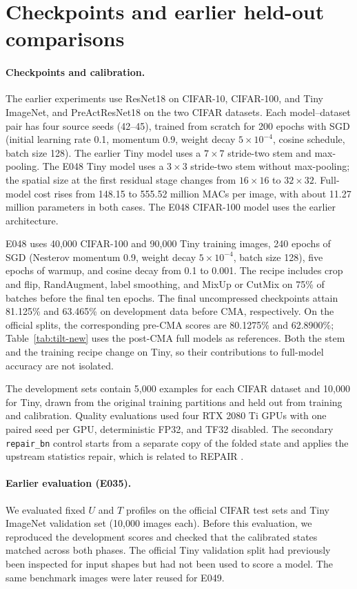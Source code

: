 \section{Checkpoints and earlier held-out comparisons}
\label{app:checkpoints}

\paragraph{Checkpoints and calibration.}
The earlier experiments use ResNet18 on CIFAR-10, CIFAR-100, and Tiny
ImageNet, and PreActResNet18 \citep{he2016preact} on the two CIFAR
datasets. Each model--dataset pair has four source seeds (42--45),
trained from scratch for 200 epochs with SGD (initial learning rate 0.1,
momentum 0.9, weight decay $5\times10^{-4}$, cosine schedule, batch size
128). The earlier Tiny model uses a $7\times7$ stride-two stem and
max-pooling. The E048 Tiny model uses a $3\times3$ stride-two stem without
max-pooling; the spatial size at the first residual stage changes from
$16\times16$ to $32\times32$. Full-model cost rises from 148.15 to
555.52 million MACs per image, with about 11.27 million parameters in
both cases. The E048 CIFAR-100 model uses the earlier architecture.

E048 uses 40,000 CIFAR-100 and 90,000 Tiny training images, 240 epochs of
SGD (Nesterov momentum 0.9, weight decay $5\times10^{-4}$, batch size
128), five epochs of warmup, and cosine decay from 0.1 to 0.001. The
recipe includes crop and flip, RandAugment, label smoothing, and MixUp or
CutMix on 75\% of batches before the final ten epochs. The final
uncompressed checkpoints attain 81.125\% and 63.465\% on development data
before CMA, respectively. On the official splits, the corresponding
pre-CMA scores are 80.1275\% and 62.8900\%; Table~\ref{tab:tilt-new} uses
the post-CMA full models as references. Both the stem and the training
recipe change on Tiny, so their contributions to full-model accuracy
are not isolated.

The development sets contain 5,000 examples for each CIFAR dataset and
10,000 for Tiny, drawn from the original training partitions and held
out from training and calibration. Quality evaluations used four RTX
2080 Ti GPUs with one paired seed per GPU, deterministic FP32, and TF32
disabled. The secondary \texttt{repair\_bn} control starts from a separate
copy of the folded state and applies the upstream statistics repair,
which is related to REPAIR \citep{jordan2023repair}.

\paragraph{Earlier evaluation (E035).}
We evaluated fixed $U$ and $T$ profiles on the official CIFAR test
sets and Tiny ImageNet validation set (10,000 images each). Before this
evaluation, we reproduced the development scores and checked that the
calibrated states matched across both phases. The official Tiny
validation split had previously been inspected for input shapes but had
not been used to score a model. The same benchmark images were later
reused for E049.

